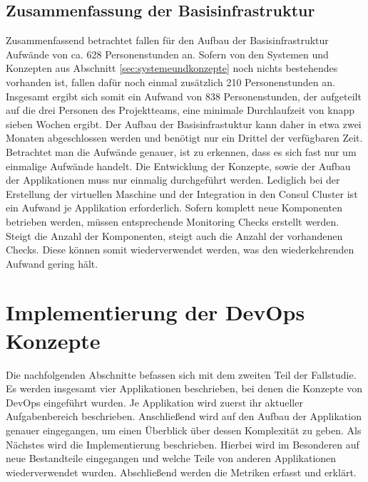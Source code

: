 \subsection{Zusammenfassung der Basisinfrastruktur}
\label{sec:zusammenfassung:basisinfrastruktur}
Zusammenfassend betrachtet fallen für den Aufbau der Basisinfrastruktur Aufwände von ca. 628 Personenstunden an. Sofern von den Systemen und Konzepten aus Abschnitt \ref{sec:systemeundkonzepte} noch nichts bestehendes vorhanden ist, fallen dafür noch einmal zusätzlich 210 Personenstunden an. Insgesamt ergibt sich somit ein Aufwand von 838 Personenstunden, der aufgeteilt auf die drei Personen des Projektteams, eine minimale Durchlaufzeit von knapp sieben Wochen ergibt. Der Aufbau der Basisinfrastuktur kann daher in etwa zwei Monaten abgeschlossen werden und benötigt nur ein Drittel der verfügbaren Zeit. Betrachtet man die Aufwände genauer, ist zu erkennen, dass es sich fast nur um einmalige Aufwände handelt. Die Entwicklung der Konzepte, sowie der Aufbau der Applikationen muss nur einmalig durchgeführt werden. Lediglich bei der Erstellung der virtuellen Maschine und der Integration in den Consul Cluster ist ein Aufwand je Applikation erforderlich. Sofern komplett neue Komponenten betrieben werden, müssen entsprechende Monitoring Checks erstellt werden. Steigt die Anzahl der Komponenten, steigt auch die Anzahl der vorhandenen Checks. Diese können somit wiederverwendet werden, was den wiederkehrenden Aufwand gering hält.

\section{Implementierung der DevOps Konzepte}
Die nachfolgenden Abschnitte befassen sich mit dem zweiten Teil der Fallstudie. Es werden insgesamt vier Applikationen beschrieben, bei denen die Konzepte von DevOps eingeführt wurden. Je Applikation wird zuerst ihr aktueller Aufgabenbereich  beschrieben. Anschließend wird auf den Aufbau der Applikation genauer eingegangen, um einen Überblick über dessen Komplexität zu geben. Als Nächstes wird die Implementierung beschrieben. Hierbei wird im Besonderen auf neue Bestandteile eingegangen und welche Teile von anderen Applikationen wiederverwendet wurden. Abschließend werden die Metriken erfasst und erklärt.

